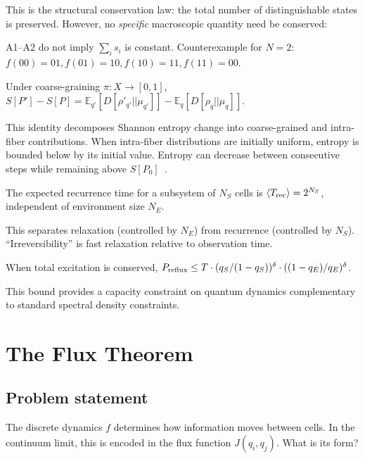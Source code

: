 \documentclass[reprint]{revtex4-2}
\begin{document}
This is the structural conservation law: the total number of distinguishable states is preserved. However, no \emph{specific} macroscopic quantity need be conserved:

\begin{theorem}
A1--A2 do not imply $\sum_i s_i$ is constant. Counterexample for $N=2$: $f(00)=01, f(01)=10, f(10)=11, f(11)=00$.
\end{theorem}

\begin{theorem}
\label{thm:entropy}
Under coarse-graining $\pi:X\to[0,1]$, $S[P']-S[P] = \mathbb{E}_{q'}[D[\rho'_{q'}||\mu_{q'}]] - \mathbb{E}_q[D[\rho_q||\mu_q]]$.
\end{theorem}
This identity decomposes Shannon entropy change into coarse-grained and intra-fiber contributions. When intra-fiber distributions are initially uniform, entropy is bounded below by its initial value. Entropy can decrease between consecutive steps while remaining above $S[P_0]$~\cite{INSPECTOR_round1}.

\begin{theorem}
The expected recurrence time for a subsystem of $N_S$ cells is $\langle T_{\rm rec}\rangle = 2^{N_S}$, independent of environment size $N_E$.
\end{theorem}
This separates relaxation (controlled by $N_E$) from recurrence (controlled by $N_S$). ``Irreversibility'' is fast relaxation relative to observation time.

\begin{theorem}
When total excitation is conserved, $P_{\rm reflux} \le T\cdot(q_S/(1-q_S))^\delta\cdot((1-q_E)/q_E)^\delta$.
\end{theorem}
This bound provides a capacity constraint on quantum dynamics complementary to standard spectral density constraints.

\section{The Flux Theorem}

\subsection{Problem statement}

The discrete dynamics $f$ determines how information moves between cells. In the continuum limit, this is encoded in the flux function $J(q_i,q_j)$. What is its form?
\end{document}
